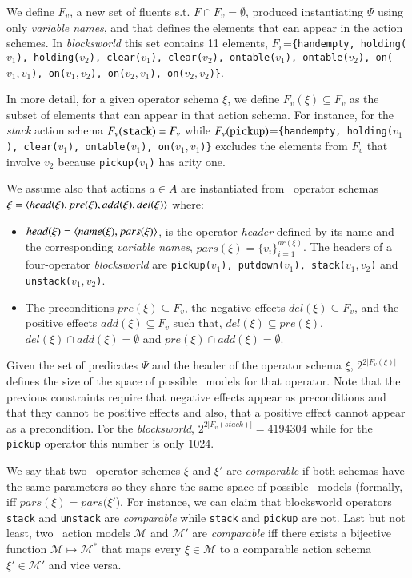 We define $F_v$, a new set of fluents s.t. $F\cap F_v=\emptyset$, produced instantiating $\Psi$ using only {\em variable names}, and that defines the elements that can appear in the action schemes. In {\em blocksworld} this set contains 11 elements, $F_v$={\small\tt\{handempty, holding($v_1$), holding($v_2$), clear($v_1$), clear($v_2$), ontable($v_1$), ontable($v_2$), on($v_1,v_1$), on($v_1,v_2$), on($v_2,v_1$), on($v_2,v_2$)\}}.

In more detail, for a given operator schema $\xi$, we define $F_v(\xi)\subseteq F_v$ as the subset of elements that can appear in that action schema. For instance, for the {\em stack} action schema $F_v({\tt stack})=F_v$ while $F_v({\tt pickup})$={\small\tt\{handempty, holding($v_1$), clear($v_1$), ontable($v_1$), on($v_1,v_1$)\}} excludes the elements from $F_v$ that involve $v_2$ because {\small\tt pickup($v_1$)} has arity one.

We assume also that actions $a\in A$ are instantiated from \strips\ operator schemas $\xi={\langle head(\xi),pre(\xi),add(\xi),del(\xi) \rangle}$ where:
\begin{itemize}
\item $head(\xi)={\langle name(\xi),pars(\xi) \rangle}$, is the operator {\em header} defined by its name and the corresponding {\em variable names}, $pars(\xi)=\{v_i\}_{i=1}^{ar(\xi)}$. The headers of a four-operator {\em blocksworld} are {\small\tt pickup($v_1$), putdown($v_1$), stack($v_1,v_2$)} and {\small\tt unstack($v_1,v_2$)}.
\item The preconditions $pre(\xi)\subseteq F_v$, the negative effects $del(\xi)\subseteq F_v$, and the positive effects $add(\xi)\subseteq F_v$ such that, $del(\xi)\subseteq pre(\xi)$, $del(\xi)\cap add(\xi)=\emptyset$ and $pre(\xi)\cap add(\xi)=\emptyset$.
\end{itemize}
Given the set of predicates $\Psi$ and the header of the operator schema $\xi$, $2^{2|F_v(\xi)|}$ defines the size of the space of possible \strips\ models for that operator. Note that the previous constraints require that negative effects appear as preconditions and that they cannot be positive effects and also, that a positive effect cannot appear as a precondition. For the {\em blocksworld}, $2^{2|F_v(stack)|}=4194304$ while for the {\tt pickup} operator this number is only 1024.

We say that two \strips\ operator schemes $\xi$ and $\xi'$ are {\em comparable} if both schemas have the same parameters so they share the same space of possible \strips\ models (formally, iff $pars(\xi)=pars(\xi'$). For instance, we can claim that blocksworld operators {\tt stack} and {\tt unstack} are {\em comparable} while  {\tt stack} and {\tt pickup} are not. Last but not least, two \strips\ action models $\mathcal{M}$ and $\mathcal{M}'$ are {\em comparable} iff there exists a bijective function $\mathcal{M} \mapsto \mathcal{M}^*$ that maps every $\xi\in\mathcal{M}$ to a comparable action schema $\xi'\in\mathcal{M'}$ and vice versa.


